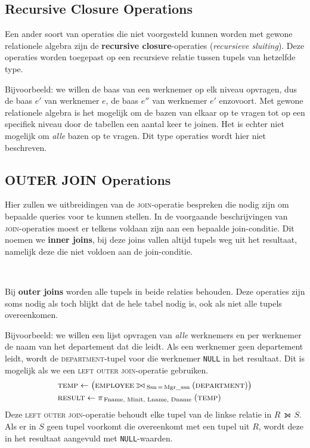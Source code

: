 \subsection{Recursive Closure Operations}
Een ander soort van operaties die niet voorgesteld kunnen worden met gewone relationele algebra zijn de \textbf{recursive closure}-operaties (\textit{recursieve sluiting}). Deze operaties worden toegepast op een recursieve relatie tussen tupels van hetzelfde type.

Bijvoorbeeld: we willen de baas van een werknemer op elk niveau opvragen, dus de baas $e'$ van werknemer $e$, de baas $e''$ van werknemer $e'$ enzovoort. Met gewone relationele algebra is het mogelijk om de bazen van elkaar op te vragen tot op een specifiek niveau door de tabellen een aantal keer te joinen. Het is echter niet mogelijk om \textit{alle} bazen op te vragen. Dit type operaties wordt hier niet beschreven.


\subsection{OUTER JOIN Operations}
Hier zullen we uitbreidingen van de \textsc{join}-operatie bespreken die nodig zijn om bepaalde queries voor te kunnen stellen. In de voorgaande beschrijvingen van \textsc{join}-operaties moest er telkens voldaan zijn aan een bepaalde join-conditie. Dit noemen we \textbf{inner joins}, bij deze joins vallen altijd tupels weg uit het resultaat, namelijk deze die niet voldoen aan de join-conditie.

~

\noindent Bij \textbf{outer joins} worden alle tupels in beide relaties behouden. Deze operaties zijn soms nodig als toch blijkt dat de hele tabel nodig is, ook als niet alle tupels overeenkomen.

Bijvoorbeeld: we willen een lijst opvragen van \textit{alle} werknemers en per werknemer de naam van het departement dat die leidt. Als een werknemer geen departement leidt, wordt de \textsc{department}-tupel voor die werknemer \texttt{NULL} in het resultaat. Dit is mogelijk als we een \textsc{left outer join}-operatie gebruiken.
\vspace{-2mm}
\begin{align*}
& \textsc{temp} \leftarrow \big( \textsc{employee} \leftouterjoin_{\;\text{Ssn} \,=\, \text{Mgr\_ssn}} (\textsc{department}) \big) \\
& \textsc{result} \leftarrow \pi_{\,\text{Fname, Minit, Lname, Dname}} \;(\textsc{temp})
\end{align*}
Deze \textsc{left outer join}-operatie behoudt elke tupel van de linkse relatie in $R \,\leftouterjoin\, S$. Als er in $S$ geen tupel voorkomt die overeenkomt met een tupel uit $R$, wordt deze in het resultaat aangevuld met \texttt{NULL}-waarden.

